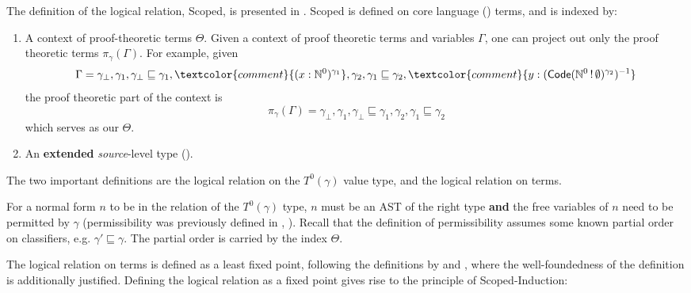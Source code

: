 The definition of the logical relation, \textsf{Scoped}, is presented in . \textsf{Scoped} is defined on core language (\coreLang{}) terms, and is indexed by:
\begin{enumerate}
  \item A context of proof-theoretic terms $\Theta$. Given a context of proof theoretic terms and variables $\Gamma$, one can project out only the proof theoretic terms $\pi_{\gamma}({\Gamma})$. For example, given 
  \[\Gamma = \gamma_\bot, \gamma_1, \gamma_\bot \sqsubseteq \gamma_1, \textcolor{comment}{(x:\mathbb{N}^0)^{\gamma_1}}, \gamma_2, \gamma_1 \sqsubseteq \gamma_2,  \textcolor{comment}{y:(\textsf{Code}(\mathbb{N}^0 \, ! \, \emptyset)^{\gamma_2})^{-1}}\]
  the proof theoretic part of the context is
  \[\pi_{\gamma}({\Gamma}) = \gamma_\bot, \gamma_1, \gamma_\bot \sqsubseteq \gamma_1, \gamma_2, \gamma_1 \sqsubseteq \gamma_2 \]
  which serves as our $\Theta$.
  \item An \textbf{extended} \textit{source}-level type (). 
\end{enumerate}

The two important definitions are the logical relation on the $T^{0} (\gamma)$ value type, and the logical relation on terms. 

For a normal form $n$ to be in the relation of the $T^{0} (\gamma)$ type, $n$ must be an AST of the right type \textbf{and} the free variables of $n$ need to be permitted by $\gamma$ (permissibility was previously defined in , ). Recall that the definition of permissibility assumes some known partial order on classifiers, e.g. $\gamma' \sqsubseteq \gamma$. The partial order is carried by the index $\Theta$. 

The logical relation on terms is defined as a least fixed point, following the definitions by \citet{plotkin-2025} and \citet{kuchta-2023}, where the well-foundedness of the definition is additionally justified. Defining the logical relation as a fixed point gives rise to the principle of \textsf{Scoped}-Induction:

\newcommand{\scoped}[2][\Theta]{\textsf{Scoped}_{{#1}, {#2}}}

